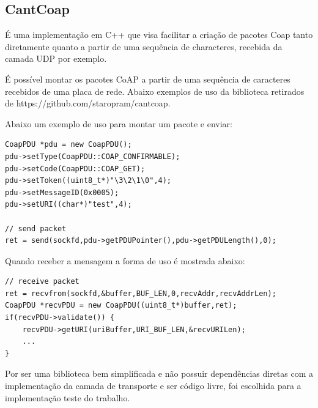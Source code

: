 \subsection{CantCoap}
\'E uma implementa\c{c}\~ao em C++ que visa facilitar a cria\c{c}\~ao de pacotes Coap tanto diretamente quanto a partir de uma sequ\^encia de characteres, recebida da camada UDP por exemplo.

\'E poss\'ivel montar os pacotes CoAP a partir de uma sequ\^encia de caracteres recebidos de uma placa de rede. Abaixo exemplos de uso da biblioteca retirados de https://github.com/staropram/cantcoap.


\lstset{escapechar=@,style=customc}

Abaixo um exemplo de uso para montar um pacote e enviar:

\begin{lstlisting}
CoapPDU *pdu = new CoapPDU();
pdu->setType(CoapPDU::COAP_CONFIRMABLE);
pdu->setCode(CoapPDU::COAP_GET);
pdu->setToken((uint8_t*)"\3\2\1\0",4);
pdu->setMessageID(0x0005);
pdu->setURI((char*)"test",4);

// send packet 
ret = send(sockfd,pdu->getPDUPointer(),pdu->getPDULength(),0);
\end{lstlisting}

Quando receber a mensagem a forma de uso \'e mostrada abaixo:
\begin{lstlisting}
// receive packet
ret = recvfrom(sockfd,&buffer,BUF_LEN,0,recvAddr,recvAddrLen);
CoapPDU *recvPDU = new CoapPDU((uint8_t*)buffer,ret);
if(recvPDU->validate()) {
    recvPDU->getURI(uriBuffer,URI_BUF_LEN,&recvURILen);
    ...
}
\end{lstlisting}

Por ser uma biblioteca bem simplificada e n\~ao possuir depend\^encias diretas com a implementa\c{c}\~ao da camada de transporte e ser c\'odigo livre, foi escolhida para a implementa\c{c}\~ao teste do trabalho.
